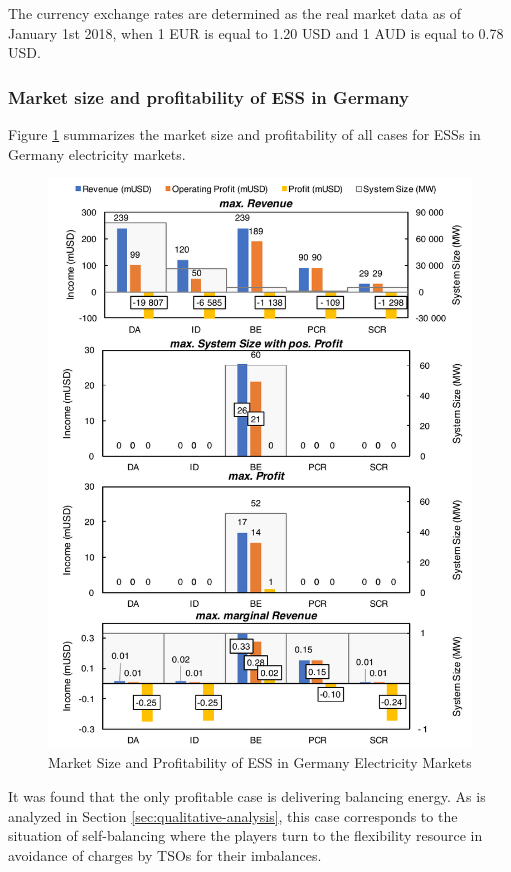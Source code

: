 The currency exchange rates are determined as the real market data as of January 1st 2018, when 1 EUR is equal to 1.20 USD and 1 AUD is equal to 0.78 USD\cite{Bloomberg}.

\subsubsection{Market size and profitability of ESS in Germany}
Figure \ref{fig:germany-ess} summarizes the market size and profitability of all cases for ESSs in Germany electricity markets. 

\begin{figure}[h!]
	\centering
	\includegraphics[width=0.9\linewidth]{Figures/Germany_ESS}
	\caption{Market Size and Profitability of ESS in Germany Electricity Markets}
	\label{fig:germany-ess}
\end{figure}

It was found that the only profitable case is delivering balancing energy. As is analyzed in Section \ref{sec:qualitative-analysis}, this case corresponds to the situation of self-balancing where the players turn to the flexibility resource in avoidance of charges by TSOs for their imbalances. 

